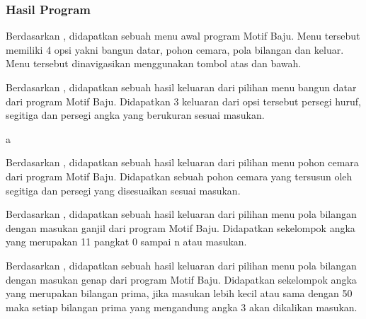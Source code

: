 \documentclass[../main.tex]{subfiles}
\begin{document}
    \subsubsection{Hasil Program}
    \begin{indentlevel0}
        \ilz{}Berdasarkan , didapatkan sebuah menu awal program Motif Baju. Menu tersebut memiliki 4 opsi yakni bangun datar, pohon cemara, pola bilangan dan keluar. Menu tersebut dinavigasikan menggunakan tombol atas dan bawah.
    \end{indentlevel0}
    \begin{indentlevel0}
        \ilz{}Berdasarkan , didapatkan sebuah hasil keluaran dari pilihan menu bangun datar dari program Motif Baju. Didapatkan 3 keluaran dari opsi tersebut persegi huruf, segitiga dan persegi angka yang berukuran sesuai masukan.
    \end{indentlevel0}
    {\color{White}a}\vspace{-1.6ex}
    \begin{indentlevel0}
        \ilz{}Berdasarkan , didapatkan sebuah hasil keluaran dari pilihan menu pohon cemara dari program Motif Baju. Didapatkan sebuah pohon cemara yang tersusun oleh segitiga dan persegi yang disesuaikan sesuai masukan.
    \end{indentlevel0}
    \begin{indentlevel0}
        \ilz{}Berdasarkan , didapatkan sebuah hasil keluaran dari pilihan menu pola bilangan dengan masukan ganjil dari program Motif Baju. Didapatkan sekelompok angka yang merupakan 11 pangkat 0 sampai n atau masukan.
    \end{indentlevel0}
    \begin{indentlevel0}
        \ilz{}Berdasarkan , didapatkan sebuah hasil keluaran dari pilihan menu pola bilangan dengan masukan genap dari program Motif Baju. Didapatkan sekelompok angka yang merupakan bilangan prima, jika masukan lebih kecil atau sama dengan 50 maka setiap bilangan prima yang mengandung angka 3 akan dikalikan masukan.
    \end{indentlevel0}
\end{document}
